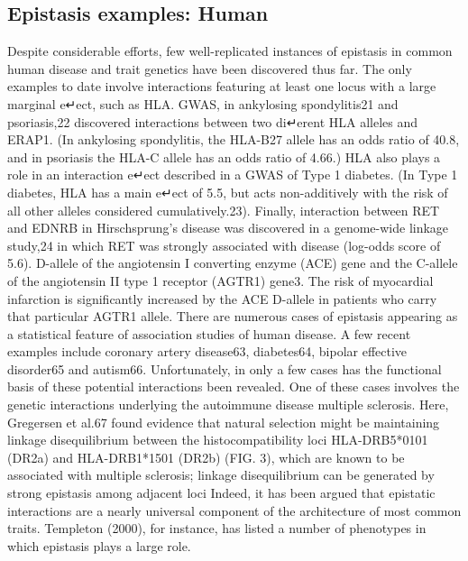 \subsection{Epistasis examples: Human}
Despite considerable efforts, few well-replicated instances of epistasis in common human disease and trait genetics have been discovered thus far. \cite{zuk2012mystery}
The only examples to date involve interactions featuring at least one locus with a large marginal e↵ect, such as HLA.  \cite{zuk2012mystery}
GWAS, in ankylosing spondylitis21 and psoriasis,22 discovered interactions between two di↵erent HLA alleles and ERAP1. (In ankylosing spondylitis, the HLA-B27 allele has an odds ratio of 40.8, and in psoriasis the HLA-C allele has an odds ratio of 4.66.) HLA also plays a role in an interaction e↵ect described in a GWAS of Type 1 diabetes. (In Type 1 diabetes, HLA has a main e↵ect of 5.5, but acts non-additively with the risk of all other alleles considered cumulatively.23). Finally, interaction between RET and EDNRB in Hirschsprung's disease was discovered in a genome-wide linkage study,24 in which RET was strongly associated with disease (log-odds score of 5.6). \cite{zuk2012mystery}
D-allele of the angiotensin I converting enzyme (ACE) gene and the C-allele of the angiotensin II type 1 receptor (AGTR1) gene3. The risk of myocardial infarction is significantly increased by the ACE D-allele in patients who carry that particular AGTR1 allele. \cite{carlborg2004epistasis}
There are numerous cases of epistasis appearing as a statistical feature of association studies of human disease. A few recent examples include coronary artery disease63, diabetes64, bipolar effective disorder65 and autism66. Unfortunately, in only a few cases has the functional basis of these potential interactions been revealed.  \cite{phillips2008epistasis}
One of these cases involves the genetic interactions underlying the autoimmune disease multiple sclerosis. Here, Gregersen et al.67 found evidence that natural selection might be maintaining linkage disequilibrium between the histocompatibility loci HLA-DRB5*0101 (DR2a) and HLA-DRB1*1501 (DR2b) (FIG. 3), which are known to be associated with multiple sclerosis; linkage disequilibrium can be generated by strong epistasis among adjacent loci \cite{phillips2008epistasis}
Indeed, it has been argued that epistatic interactions are a nearly universal component of the architecture of most common traits. Templeton (2000), for instance, has listed a number of phenotypes in which epistasis plays a large role.  \cite{culverhouse2002perspective}

